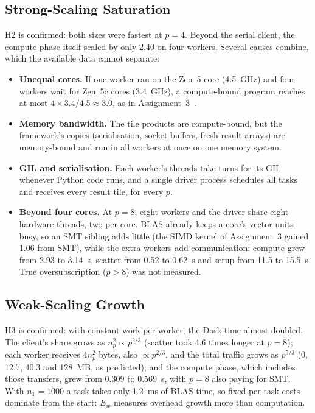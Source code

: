 \documentclass[conference,a4paper]{IEEEtran}
\begin{document}
\subsection{Strong-Scaling Saturation}
\label{sec:disc-strong}
H2 is confirmed: both sizes were fastest at $p = 4$. Beyond the serial client,
the compute phase itself scaled by only 2.40 on four workers. Several causes
combine, which the available data cannot separate:
\begin{itemize}[itemsep=1pt]
  \item \textbf{Unequal cores.} If one worker ran on the Zen~5 core (4.5~GHz)
        and four workers wait for Zen~5c cores (3.4~GHz), a compute-bound
        program reaches at most $4 \times 3.4/4.5 \approx 3.0$, as in
        Assignment~3~\cite{nbc330}.
  \item \textbf{Memory bandwidth.} The tile products are compute-bound, but the
        framework's copies (serialisation, socket buffers, fresh result arrays)
        are memory-bound and run in all workers at once on one memory system.
  \item \textbf{GIL and serialisation.} Each worker's threads take turns for its
        GIL whenever Python code runs, and a single driver process schedules all
        tasks and receives every result tile, for every $p$.
  \item \textbf{Beyond four cores.} At $p = 8$, eight workers and the driver
        share eight hardware threads, two per core. BLAS already keeps a core's
        vector units busy, so an SMT sibling adds little (the SIMD kernel of
        Assignment~3 gained 1.06 from SMT), while the extra workers add
        communication: compute grew from 2.93 to 3.14~s, scatter from 0.52 to
        0.62~s and setup from 11.5 to 15.5~s. True oversubscription ($p > 8$)
        was not measured.
\end{itemize}

\subsection{Weak-Scaling Growth}
\label{sec:disc-weak}
H3 is confirmed: with constant work per worker, the Dask time almost doubled.
The client's share grows as $n_p^2 \propto p^{2/3}$ (scatter took 4.6 times
longer at $p = 8$); each worker receives $4n_p^2$ bytes, also $\propto p^{2/3}$,
and the total traffic grows as $p^{5/3}$ (0, 12.7, 40.3 and 128~MB, as
predicted); and the compute phase, which includes those transfers, grew from
0.309 to 0.569~s, with $p = 8$ also paying for SMT. With $n_1 = 1000$ a task
takes only 1.2~ms of BLAS time, so fixed per-task costs dominate from the
start: $E_w$ measures overhead growth more than computation.
\end{document}

